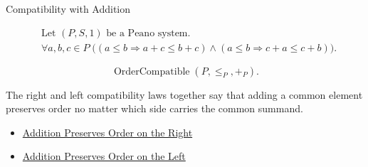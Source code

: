 \begin{topicbox}{Compatibility with Addition}
\begin{remark*}
\[
\begin{aligned}
&\text{Let } (P,S,1) \text{ be a Peano system.}\\
&\forall a,b,c \in P\;
\bigl((a \le b \Longrightarrow a+c \le b+c)
\land
(a \le b \Longrightarrow c+a \le c+b)\bigr).
\end{aligned}
\]
\end{remark*}

\begin{remark*}
\[
\operatorname{OrderCompatible}(P,\leq_P,+_P).
\]
\end{remark*}

\begin{remark*}[Interpretation]
The right and left compatibility laws together say that adding a common
element preserves order no matter which side carries the common summand.
\end{remark*}

\begin{dependencies}
\begin{itemize}
  \item \hyperref[thm:addition-preserves-order-on-right]{Addition Preserves Order on the Right}
  \item \hyperref[thm:addition-preserves-order-on-left]{Addition Preserves Order on the Left}
\end{itemize}
\end{dependencies}
\end{topicbox}

